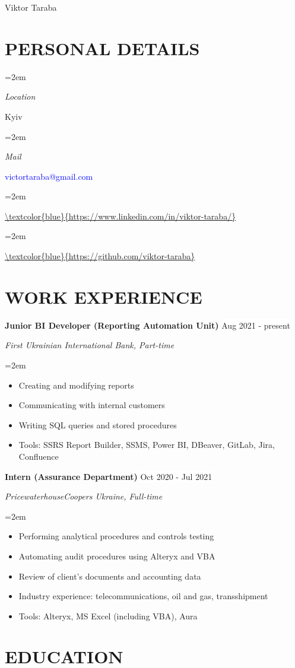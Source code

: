 \documentclass[paper=a4,fontsize=11pt]{scrartcl} %
\newlength{\spacebox}
\newcommand{\sepspace}{\vspace*{1em}}		%
\newcommand{\MyName}[1]{ %
		\Huge \usefont{OT1}{phv}{b}{n} \hfill #1
		\par \normalsize \normalfont}
\newcommand{\NewPart}[1]{\section*{\uppercase{#1}}}
\newcommand{\PersonalEntry}[2]{
		\noindent\hangindent=2em\hangafter=0 %
		\parbox{\spacebox}{        %
		\textit{#1}}		       %
		\hspace{1.5em} #2 \par}    %
\newcommand{\EducationEntry}[4]{
		\noindent \textbf{#1} \hfill      %
        \colorbox{White}{\color{Black}#2} \par  %
		\noindent \textit{#3} \par        %
		\noindent\hangindent=2em\hangafter=0 \small #4 %
		\normalsize \par}
\newcommand{\WorkEntry}[4]{				  %
		\noindent \textbf{#1} \hfill      %
		\colorbox{White}{\color{Black}#2} \par  %
		\noindent \textit{#3} \par              %
		\noindent\hangindent=2em\hangafter=0 \small #4 %
		\normalsize \par}
\begin{document}

\MyName{Viktor Taraba}
\sepspace

\NewPart{Personal details}{}

\PersonalEntry{Location}{Kyiv}
\PersonalEntry{Mail}{\textcolor{blue}{victortaraba@gmail.com}}
\PersonalEntry{\faLinkedin}{\url{\textcolor{blue}{https://www.linkedin.com/in/viktor-taraba/}}}
\PersonalEntry{\faGithub}{\url{\textcolor{blue}{https://github.com/viktor-taraba}}}
\NewPart{Work experience}{}

\WorkEntry{Junior BI Developer (Reporting Automation Unit)}{Aug 2021 - present}{First Ukrainian International Bank, Part-time}{ \begin{itemize} \setlength{\itemsep}{0pt} \item Creating and modifying reports
\item Communicating with internal customers
\item Writing SQL queries and stored procedures \item[\textcolor{gray}{\textbullet}] Tools: SSRS Report Builder, SSMS, Power BI, DBeaver, GitLab, Jira, Confluence \end{itemize}}
\sepspace

\WorkEntry{Intern (Assurance Department)}{Oct 2020 - Jul 2021}{PricewaterhouseCoopers Ukraine, Full-time}{
\begin{itemize} \setlength{\itemsep}{0pt} \item Performing analytical procedures and controls testing \item Automating audit procedures using Alteryx and VBA \item Review of client's documents and accounting data 
\item Industry experience: telecommunications, oil and gas, transshipment \item[\textcolor{gray}{\textbullet}] Tools: Alteryx, MS Excel (including VBA), Aura \end{itemize}}

\NewPart{Education}{}
\end{document}

